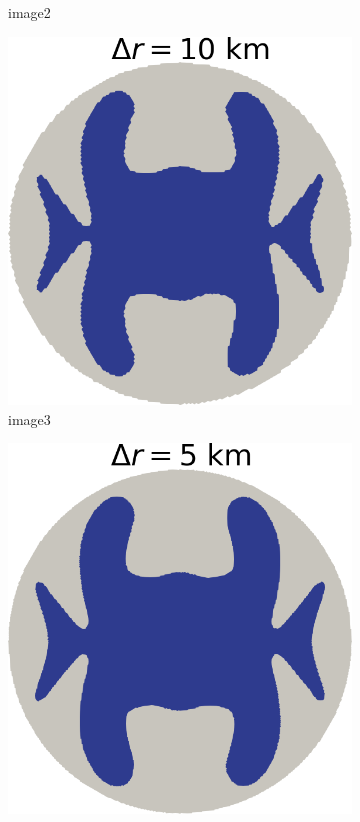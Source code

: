 \documentclass{article}
\begin{document}
\begin{figure}[!h]
\begin{minipage}[t]{.25\textwidth}
\begin{subfigure}{\textwidth}
			\caption{image2}
			\label{fig:2}
		\end{subfigure}\hfil %
		\begin{subfigure}{\textwidth}
			\includegraphics[width=\linewidth]{../fig/Grounded_zone_10km.png}
			\caption{image3}
			\label{fig:3}
		\end{subfigure}
	\end{minipage}\hfil
	\begin{minipage}[t]{.25\textwidth}
		\begin{subfigure}{\textwidth}
			\includegraphics[width=\linewidth]{../fig/Grounded_zone_5km.png}

\end{subfigure}
\end{minipage}
\end{figure}
\end{document}
